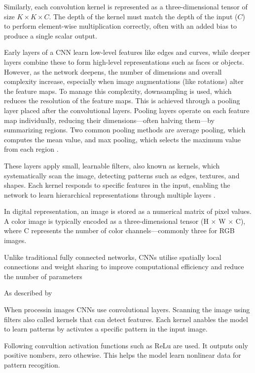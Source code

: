 \documentclass[a4paper,10pt,twocolumn]{article}
\numberwithin{figure}{section}
\numberwithin{table}{section}
\begin{document}
Similarly, each convolution kernel is represented as a three-dimensional 
tensor of size \(K \times K \times C\). The depth of the kernel must 
match the depth of the input (\(C\)) to perform element-wise multiplication
 correctly, often with an added bias to produce a single scalar output. \cite{VerdhanVaibhav2021CVUD} 




Early layers of a CNN learn low-level features like edges and curves, 
while deeper layers combine these to form high-level representations 
such as faces or objects. However, as the network deepens, 
the number of dimensions and overall complexity increase, 
especially when image augmentations (like rotations) 
alter the feature maps. To manage this complexity, 
downsampling is used, which reduces the resolution of the 
feature maps. This is achieved through a pooling layer 
placed after the convolutional layers. Pooling layers 
operate on each feature map individually, reducing their 
dimensions—often halving them—by summarizing regions.
Two common pooling methods are average pooling, which 
computes the mean value, and max pooling, which selects 
the maximum value from each region \citep{VerdhanVaibhav2021CVUD}.




These layers apply small, learnable filters, also known as kernels,
which systematically scan the image, detecting patterns 
such as edges, textures, and shapes. Each kernel responds 
to specific features in the input, enabling the network 
to learn hierarchical representations through multiple layers \citep{alif2025yolov12}.

In digital representation, an image is stored as a numerical matrix of pixel values.
A color image is typically encoded as a three-dimensional tensor (H × W × C), where C represents the number of color channels—commonly three for RGB images.

Unlike traditional fully connected networks, 
CNNs utilise spatially local connections and weight 
sharing to improve computational efficiency and 
reduce the number of parameters

As described by 


When processin images CNNs use convolutional layers. 
Scanning the image using filters also called kernels that
can detect features. Each kernel anables the model to learn patterns
by activates a specific pattern in the input image.



Following convultion activation functions such as ReLu are used.
It outputs only positive nombers, zero othewise. This helps the model
learn nonlinear data for pattern recogition.
\end{document}
